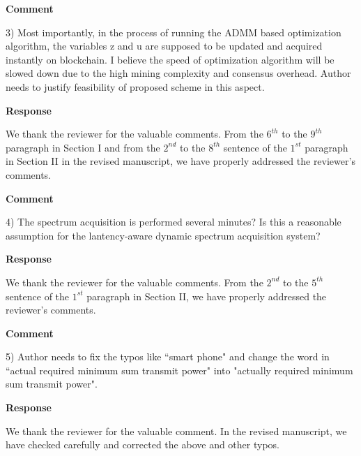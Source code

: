 \documentclass[12pt,draftcls, onecolumn]{IEEEtran}
\begin{document}
\vspace{3mm}
\noindent\textcolor[rgb]{1.00,0.00,0.00}{\textbf{Comment}}
\vspace{3mm}


3) Most importantly, in the process of running the ADMM based optimization algorithm, the variables z and u are supposed to be updated and acquired instantly on blockchain. I believe the speed of optimization algorithm will be slowed down due to the high mining complexity and consensus overhead. Author needs to justify feasibility of proposed scheme in this aspect.  

\vspace{3mm} \noindent\textcolor[rgb]{0.00,0.00,1.00}{\textbf{Response}}
\vspace{2mm}

We thank the reviewer for the valuable comments. From the $ 6^{th} $ to the $ 9^{th} $ paragraph in Section I and from the $ 2^{nd} $ to the $ 8^{th} $ sentence of the $ 1^{st} $ paragraph in Section II in the revised manuscript, we have properly addressed the reviewer's comments.

\vspace{3mm}
\noindent\textcolor[rgb]{1.00,0.00,0.00}{\textbf{Comment}}
\vspace{3mm}

4) The spectrum acquisition is performed several minutes? Is this a reasonable assumption for the lantency-aware dynamic spectrum acquisition system?

\vspace{3mm} \noindent\textcolor[rgb]{0.00,0.00,1.00}{\textbf{Response}}
\vspace{2mm}

We thank the reviewer for the valuable comments. From the $ 2^{nd} $ to the $ 5^{th} $ sentence of the $ 1^{st} $ paragraph in Section II, we have properly addressed the reviewer's comments.


\vspace{3mm}
\noindent\textcolor[rgb]{1.00,0.00,0.00}{\textbf{Comment}}
\vspace{3mm}

5) Author needs to fix the typos like ``smart phone" and change the word in ``actual required minimum sum transmit power" into "actually required minimum sum transmit power".


\vspace{3mm} \noindent\textcolor[rgb]{0.00,0.00,1.00}{\textbf{Response}}
\vspace{2mm}

We thank the reviewer for the valuable comment. In the revised manuscript, we have checked carefully and corrected the above and other typos. 

 
	
\end{document}
